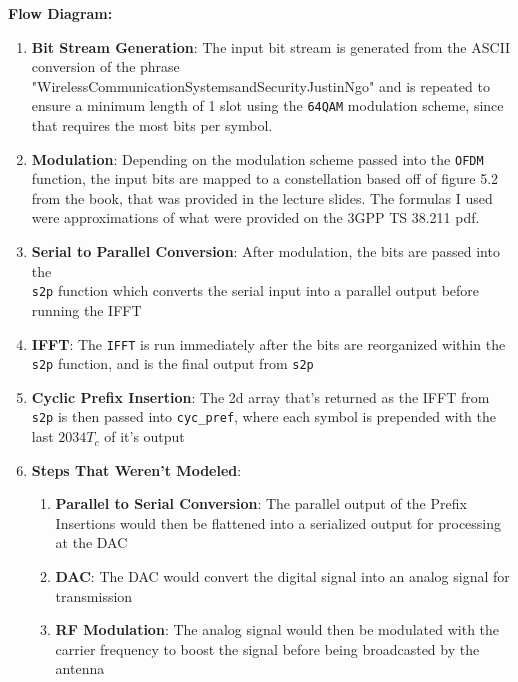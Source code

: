 \documentclass[letterpaper, 11pt]{article}
\newcommand{\secHeader}[1]{\vspace{2mm} \noindent \textbf{#1:}\vspace{-4mm}}
\begin{document}
\newpage
\secHeader{Flow Diagram}
\vspace{5mm}
\begin{enumerate}
    \item \textbf{Bit Stream Generation}: The input bit stream is generated from the ASCII conversion of the phrase "WirelessCommunicationSystemsandSecurityJustinNgo" 
    and is repeated to ensure a minimum length of 1 slot using the \texttt{64QAM} modulation scheme, since that requires the most bits per symbol.
    \item \textbf{Modulation}: Depending on the modulation scheme passed into the \texttt{OFDM} function, the input bits are mapped to a constellation based off of figure 5.2
    from the book, that was provided in the lecture slides. The formulas I used were approximations of what were provided on the 3GPP TS 38.211 pdf.
    \item \textbf{Serial to Parallel Conversion}: After modulation, the bits are passed into the \\
    \texttt{s2p} function which converts the serial input into a parallel output before running the IFFT
    \item \textbf{IFFT}: The \texttt{IFFT} is run immediately after the bits are reorganized within the \texttt{s2p} function, and is the final output from \texttt{s2p}
    \item \textbf{Cyclic Prefix Insertion}: The 2d array that's returned as the IFFT from \texttt{s2p} is then passed into \texttt{cyc\_pref}, where each symbol 
    is prepended with the last $2034T_c$ of it's output
    \item \textbf{Steps That Weren't Modeled}:
    \begin{enumerate}
        \item \textbf{Parallel to Serial Conversion}: The parallel output of the Prefix Insertions would then be flattened into a serialized output for processing at the DAC
        \item \textbf{DAC}: The DAC would convert the digital signal into an analog signal for transmission
        \item \textbf{RF Modulation}: The analog signal would then be modulated with the carrier frequency to boost the signal before being broadcasted by the antenna
    \end{enumerate}
\end{enumerate}
\end{document}
